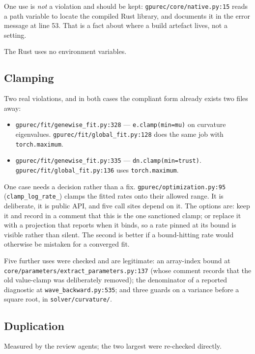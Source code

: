\documentclass[11pt]{article}
\newcommand{\loc}[1]{\nolinkurl{#1}}
\newcommand{\dir}[1]{\nolinkurl{#1}}
\begin{document}
One use is \emph{not} a violation and should be kept:
\loc{gpurec/core/native.py:15} reads a path variable to locate the compiled Rust
library, and documents it in the error message at line 53.  That is a fact about
where a build artefact lives, not a setting.

The Rust uses no environment variables.

\subsection{Clamping}
\label{sec:clamp}

Two real violations, and in both cases the compliant form already exists two
files away:

\begin{itemize}
  \item \loc{gpurec/fit/genewise\_fit.py:328} --- \texttt{e.clamp(min=mu)} on
        curvature eigenvalues.  \loc{gpurec/fit/global\_fit.py:128} does the
        same job with \texttt{torch.maximum}.
  \item \loc{gpurec/fit/genewise\_fit.py:335} ---
        \texttt{dn.clamp(min=trust)}.  \loc{gpurec/fit/global\_fit.py:136} uses
        \texttt{torch.maximum}.
\end{itemize}

One case needs a decision rather than a fix.  \loc{gpurec/optimization.py:95}
(\texttt{clamp\_log\_rate\_}) clamps the fitted rates onto their allowed range.
It is deliberate, it is public API, and five call sites depend on it.  The
options are: keep it and record in a comment that this is the one sanctioned
clamp; or replace it with a projection that reports when it binds, so a rate
pinned at its bound is visible rather than silent.  The second is
better if a bound-hitting rate would otherwise be mistaken for a converged fit.

Five further uses were checked and are legitimate: an array-index bound at
\loc{core/parameters/extract\_parameters.py:137} (whose comment records that the
old value-clamp was deliberately removed); the denominator of a reported
diagnostic at \loc{wave\_backward.py:535}; and three guards on a variance before
a square root, in \dir{solver/curvature/}.

\subsection{Duplication}

Measured by the review agents; the two largest were re-checked directly.
\end{document}
